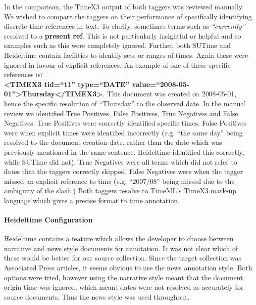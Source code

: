 \documentclass{mprop}
\let\oldcite=\cite
\renewcommand\cite[1]{\ifthenelse{\equal{#1}{NEEDED}}{\ensuremath{^\texttt{[citation~needed]}}}{\oldcite{#1}}}
\begin{document}
In the comparison, the TimeX3 output of both taggers was reviewed manually. We wished to compare the taggers on their performance of specifically identifying discrete time references in text. To clarify, sometimes terms such as \textit{``currently''} resolved to a \textbf{present ref}. This is not particularly insightful or helpful and so examples such as this were completely ignored. Further, both SUTime and Heideltime contain facilities to identify sets or ranges of times. Again these were ignored in favour of explicit references. An example of one of these specific references is: 
\\ \textbf{<TIMEX3 tid=``t1'' type=``DATE'' value=``2008-05-01''>Thursday</TIMEX3>}.
This document was created on 2008-05-01, hence the specific resolution of ``Thursday'' to the observed date.
In the manual review we identified True Positives, False Positives, True Negatives and False Negatives. True Positives were correctly identified specific times. False Positives were when explicit times were identified incorrectly (e.g. ``the same day'' being resolved to the document creation date, rather than the date which was previously mentioned in the same sentence. Heideltime identified this correctly, while SUTime did not). True Negatives were all terms which did not refer to dates that the taggers correctly skipped. False Negatives were when the tagger missed an explicit reference to time (e.g. ``2007/08'' being missed due to the ambiguity of the slash.)
Both taggers resolve to TimeML's TimeX3\cite{timeml} mark-up language which gives a precise format to time annotation.

\paragraph{Heideltime Configuration}
Heideltime contains a feature which allows the developer to choose between narrative and news style documents for annotation. It was not clear which of these would be better for our source collection. Since the target collection was Associated Press articles, it seems obvious to use the news annotation style. Both options were tried, however using the narrative style meant that the document origin time was ignored, which meant dates were not resolved as accurately for source documents. Thus the news style was used throughout.
\end{document}
